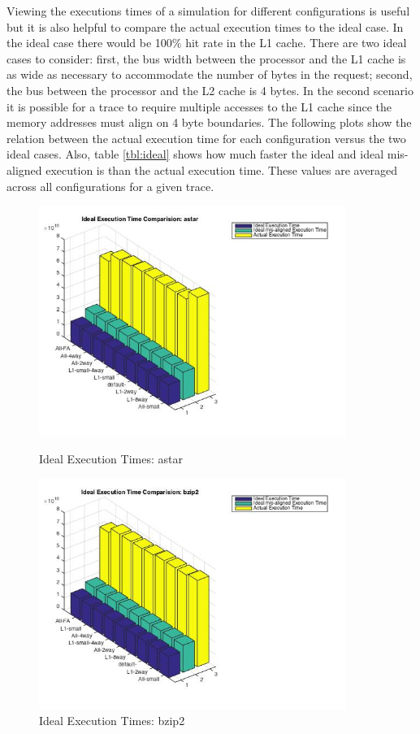 \documentclass[11pt,titlepage]{article}
\begin{document}
    Viewing the executions times of a simulation for different configurations is useful but it is also helpful to compare the actual execution times to the ideal case. In the ideal case there would be 100\% hit rate in the L1 cache. There are two ideal cases to consider: first, the bus width between the processor and the L1 cache is as wide as necessary to accommodate the number of bytes in the request; second, the bus between the processor and the L2 cache is 4 bytes. In the second scenario it is possible for a trace to require multiple accesses to the L1 cache since the memory addresses must align on 4 byte boundaries. The following plots show the relation between the actual execution time for each configuration versus the two ideal cases. Also, table \ref{tbl:ideal} shows how much faster the ideal and ideal mis-aligned execution is than the actual execution time. These values are averaged across all configurations for a given trace.
    \begin{figure}[H]
      \centering
      \begin{minipage}{.5\textwidth}
        \centering
        \includegraphics[width=10cm]{idealAstar}
        \caption{Ideal Execution Times: astar}
        \label{fig:idealA}
      \end{minipage}%
      \begin{minipage}{.5\textwidth}
        \centering
        \includegraphics[width=10cm]{idealBzip2}
        \caption{Ideal Execution Times: bzip2}
        \label{fig:idealB}
      \end{minipage}
    \end{figure}
\end{document}
